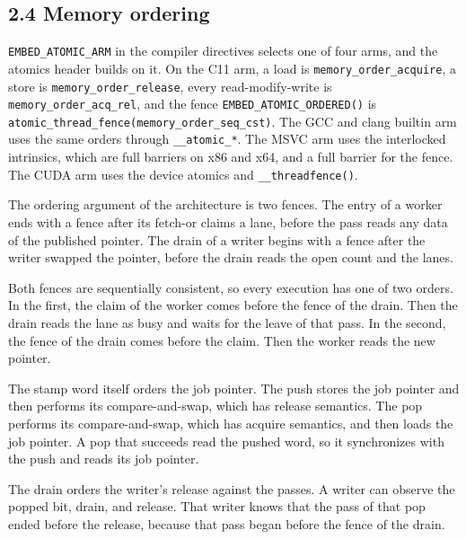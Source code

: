 \subsection{\texorpdfstring{2.4 Memory ordering}{2.4 Memory ordering}}

\texttt{EMBED\_\allowbreak{}ATOMIC\_\allowbreak{}ARM} in the compiler directives selects one of four arms, and the atomics header builds on it. On the C11 arm, a load is \texttt{memory\_\allowbreak{}order\_\allowbreak{}acquire}, a store is \texttt{memory\_\allowbreak{}order\_\allowbreak{}release}, every read-modify-write is \texttt{memory\_\allowbreak{}order\_\allowbreak{}acq\_\allowbreak{}rel}, and the fence \texttt{EMBED\_\allowbreak{}ATOMIC\_\allowbreak{}ORDERED()} is \texttt{atomic\_\allowbreak{}thread\_\allowbreak{}fence(memory\_\allowbreak{}order\_\allowbreak{}seq\_\allowbreak{}cst)}. The GCC and clang builtin arm uses the same orders through \texttt{\_\allowbreak{}\_\allowbreak{}atomic\_\allowbreak{}*}. The MSVC arm uses the interlocked intrinsics, which are full barriers on x86 and x64, and a full barrier for the fence. The CUDA arm uses the device atomics and \texttt{\_\allowbreak{}\_\allowbreak{}threadfence()}.

The ordering argument of the architecture is two fences. The entry of a worker ends with a fence after its fetch-or claims a lane, before the pass reads any data of the published pointer. The drain of a writer begins with a fence after the writer swapped the pointer, before the drain reads the open count and the lanes.

Both fences are sequentially consistent, so every execution has one of two orders. In the first, the claim of the worker comes before the fence of the drain. Then the drain reads the lane as busy and waits for the leave of that pass. In the second, the fence of the drain comes before the claim. Then the worker reads the new pointer.

The stamp word itself orders the job pointer. The push stores the job pointer and then performs its compare-and-swap, which has release semantics. The pop performs its compare-and-swap, which has acquire semantics, and then loads the job pointer. A pop that succeeds read the pushed word, so it synchronizes with the push and reads its job pointer.

The drain orders the writer's release against the passes. A writer can observe the popped bit, drain, and release. That writer knows that the pass of that pop ended before the release, because that pass began before the fence of the drain.

